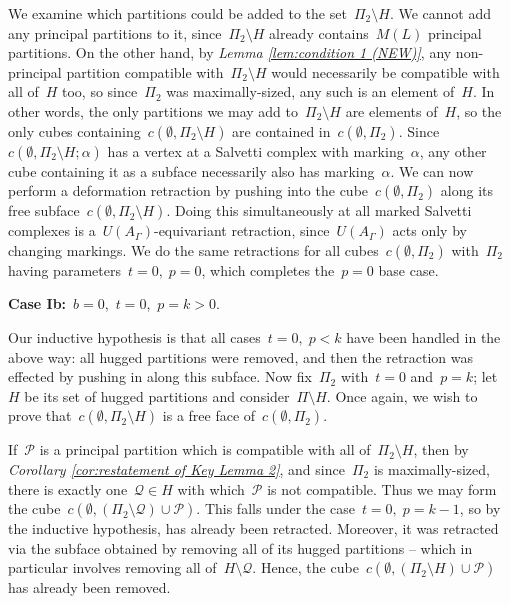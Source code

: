 \documentclass[11pt]{amsart}
\theoremstyle{definition}
\theoremstyle{definition}
\theoremstyle{definition}
\theoremstyle{definition}
\newcommand{\calQ}{\mathcal{Q}}
\newcommand{\calP}{\mathcal{P}} %
\newcommand{\uag}{U(A_{\Gamma})} %
\begin{document}
We examine which partitions could be added to the set~$\Pi_2 \setminus H$. We cannot add any principal partitions to it, since~$\Pi_2 \setminus H$ already contains~$M(L)$ principal partitions. On the other hand, by \textit{Lemma \ref{lem:condition 1 (NEW)}}, any non-principal partition compatible with~$\Pi_2 \setminus H$ would necessarily be compatible with all of~$H$ too, so since~$\Pi_2$ was maximally-sized, any such is an element of~$H$. In other words, the only partitions we may add to~$\Pi_2 \setminus H$ are elements of~$H$, so the only cubes containing~$c(\emptyset, \Pi_2 \setminus H)$ are contained in~$c(\emptyset, \Pi_2)$. Since~$c(\emptyset, \Pi_2 \setminus H; \alpha)$ has a vertex at a Salvetti complex with marking~$\alpha$, any other cube containing it as a subface necessarily also has marking~$\alpha$. We can now perform a deformation retraction by pushing into the cube~$c(\emptyset, \Pi_2)$ along its free subface~$c(\emptyset, \Pi_2 \setminus H)$. Doing this simultaneously at all marked Salvetti complexes is a~$\uag$-equivariant retraction, since~$\uag$ acts only by changing markings. We do the same retractions for all cubes~$c(\emptyset, \Pi_2)$ with~$\Pi_2$ having parameters~$t = 0,\; p = 0$, which completes the~$p = 0$ base case.

\textbf{Case Ib:}~$b = 0$,~$t = 0$,~$p = k > 0$.

Our inductive hypothesis is that all cases~$t = 0,\; p < k$ have been handled in the above way: all hugged partitions were removed, and then the retraction was effected by pushing in along this subface. Now fix~$\Pi_2$ with~$t = 0$ and~$p = k$; let~$H$ be its set of hugged partitions and consider~$\Pi \setminus H$. Once again, we wish to prove that~$c(\emptyset, \Pi_2 \setminus H)$ is a free face of~$c(\emptyset, \Pi_2)$. 

If~$\calP$ is a principal partition which is compatible with all of~$\Pi_2 \setminus H$, then by \emph{Corollary \ref{cor:restatement of Key Lemma 2}}, and since~$\Pi_2$ is maximally-sized, there is exactly one~$\calQ \in H$ with which~$\calP$ is not compatible. Thus we may form the cube~$c(\emptyset, (\Pi_2 \setminus \calQ) \cup \calP)$. This falls under the case~$t = 0,\; p = k-1$, so by the inductive hypothesis, has already been retracted. Moreover, it was retracted via the subface obtained by removing all of its hugged partitions -- which in particular involves removing all of~$H \setminus \calQ$. Hence, the cube~$c(\emptyset, (\Pi_2 \setminus H) \cup \calP)$ has already been removed. 
\end{document}
